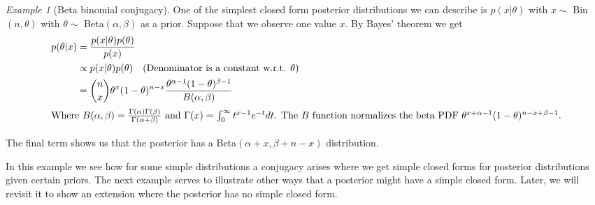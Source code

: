 \documentclass[11pt]{amsart}
\theoremstyle{theorem} %
\theoremstyle{definition}                  %
\theoremstyle{example}                       %
\theoremstyle{remark}                       %
\newtheorem{exmp}[thm]{Example}  %
\numberwithin{equation}{section}
\begin{document}
\begin{exmp}[Beta binomial conjugacy]
    One of the simplest closed form posterior distributions we can describe is $p(x|\theta)$ with $x\sim$ Bin$(n,\theta)$ with $\theta \sim$ Beta$(\alpha,\beta)$ as a prior. Suppose that we observe one value $x$. By Bayes' theorem we get \begin{align*}
        p(\theta|x)&=\frac{p(x|\theta)p(\theta)}{p(x)}\\
        &\propto p(x|\theta)p(\theta) \quad \text{(Denominator is a constant w.r.t. $\theta$)}\\
        &={n \choose x}\theta^x(1-\theta)^{n-x}\frac{\theta^{\alpha-1}(1-\theta)^{\beta-1}}{B(\alpha,\beta)}\\
        \intertext{Where $B(\alpha,\beta)=\frac{\Gamma(\alpha)\Gamma(\beta)}{\Gamma(\alpha+\beta)}$ and $\Gamma(x)=\int_0^\infty t^{x-1}e^{-t}dt$. The $B$ function normalizes the beta PDF $\theta^{x+\alpha-1}(1-\theta)^{n-x+\beta-1}$.}
    \end{align*}
    
    The final term shows us that the posterior has a Beta$(\alpha+x,\beta+n-x)$ distribution.
\end{exmp}

In this example we see how for some simple distributions a conjugacy arises where we get simple closed forms for posterior distributions given certain priors. The next example serves to illustrate other ways that a posterior might have a simple closed form. Later, we will revisit it to show an extension where the posterior has no simple closed form.
\end{document}
